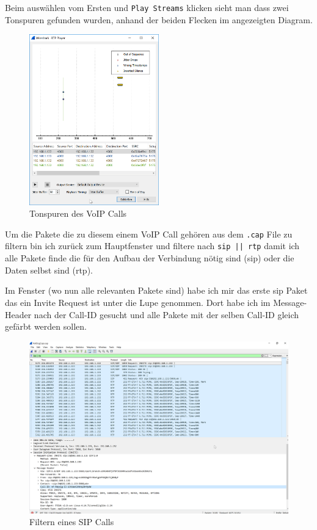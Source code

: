 \documentclass[12pt,a4paper,titlepage,oneside]{scrartcl}
\begin{document}
Beim auswählen vom Ersten und \lstinline{Play Streams} klicken sieht man dass zwei Tonspuren gefunden wurden, anhand der beiden Flecken im angezeigten Diagram.

\begin{figure}[h!]
  \centering
    \includegraphics[width=0.5\textwidth]{./imgs/intranet_screenshots/ws_rtpplayer.png}
  \caption{Tonspuren des VoIP Calls}
  \label{fig:rtpplayer}
\end{figure}

Um die Pakete die zu diesem einem VoIP Call gehören aus dem \lstinline{.cap} File zu filtern bin ich zurück zum Hauptfenster und filtere nach \lstinline{sip || rtp} damit ich alle Pakete finde die für den Aufbau der Verbindung nötig sind (sip) oder die Daten selbst sind (rtp).

Im Fenster (wo nun alle relevanten Pakete sind) habe ich mir das erste sip Paket das ein Invite Request ist unter die Lupe genommen. Dort habe ich im Message-Header nach der Call-ID gesucht und alle Pakete mit der selben Call-ID gleich gefärbt werden sollen.

\begin{figure}[h!]
  \centering
    \includegraphics[width=1\textwidth]{./imgs/intranet_screenshots/ws_sipcallfilter.png}
  \caption{Filtern eines SIP Calls}
  \label{fig:sipcallfilter}
\end{figure}
\end{document}

